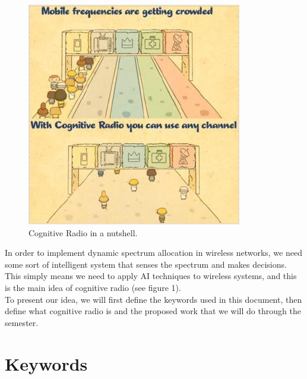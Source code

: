 \documentclass[]{scrartcl}
\begin{document}
\begin{figure}[H]
\begin{center}
  \includegraphics[scale=0.5]{cognitive1.png}
  \caption{Cognitive Radio in a nutshell.}
\end{center}
\end{figure}

In order to implement dynamic spectrum allocation in
wireless networks, we need some sort of intelligent system that senses
the spectrum and makes decisions. This simply means we need to apply AI
techniques to wireless systems, and this is the main idea of cognitive radio
\cite{planning} (see figure 1).\\

To present our idea, we will first define the keywords used in this document,
then define what cognitive radio is and the proposed work that we will
do through the semester.

\section{Keywords}
\end{document}
